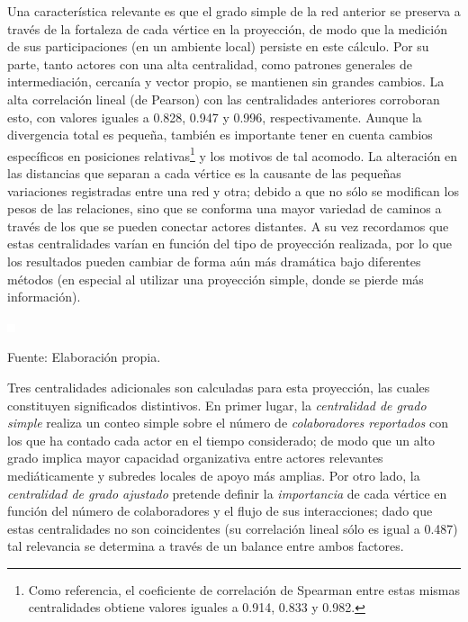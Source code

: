 \documentclass[letterpaper, 11pt]{book}
\theoremstyle{definition}
\theoremstyle{remark}
\begin{document}
Una característica relevante es que el grado simple de la red anterior se preserva a través de la fortaleza de cada vértice en la proyección, de modo que la medición de sus participaciones (en un ambiente local) persiste en este cálculo. 
Por su parte, tanto actores con una alta centralidad, como patrones generales de intermediación, cercanía y vector propio, se mantienen sin grandes cambios. 
La alta correlación lineal (de Pearson) con las centralidades anteriores corroboran esto, con valores iguales a 0.828, 0.947 y 0.996, respectivamente. 
Aunque la divergencia total es pequeña, también es importante tener en cuenta cambios específicos en posiciones relativas\footnote{
    Como referencia, el coeficiente de correlación de Spearman entre estas mismas centralidades obtiene valores iguales a 0.914, 0.833 y 0.982. 
} y los motivos de tal acomodo. 
La alteración en las distancias que separan a cada vértice es la causante de las pequeñas variaciones registradas entre una red y otra; debido a que no sólo se modifican los pesos de las relaciones, sino que se conforma una mayor variedad de caminos a través de los que se pueden conectar actores distantes. 
A su vez recordamos que estas centralidades varían en función del tipo de proyección realizada, por lo que los resultados pueden cambiar de forma aún más dramática bajo diferentes métodos (en especial al utilizar una proyección simple, donde se pierde más información). 

\pagebreak
\hspace{-1.5em} \begin{minipage}{\linewidth}
\centering\bigskip
{} \label{5_8_centralidadesenRed}

\includegraphics[scale=0.1]{img/null.png}
\vspace{53em}
\par\bigskip
\small Fuente: Elaboración propia.
\end{minipage}\bigskip

Tres centralidades adicionales son calculadas para esta proyección, las cuales constituyen significados distintivos. 
En primer lugar, la \emph{centralidad de grado simple} realiza un conteo simple sobre el número de \emph{colaboradores reportados} con los que ha contado cada actor en el tiempo considerado; de modo que un alto grado implica mayor capacidad organizativa entre actores relevantes mediáticamente y subredes locales de apoyo más amplias. 
Por otro lado, la \emph{centralidad de grado ajustado} pretende definir la \emph{importancia} de cada vértice en función del número de colaboradores y el flujo de sus interacciones; dado que estas centralidades no son coincidentes (su correlación lineal sólo es igual a 0.487) tal relevancia se determina a través de un balance entre ambos factores. 
\end{document}
